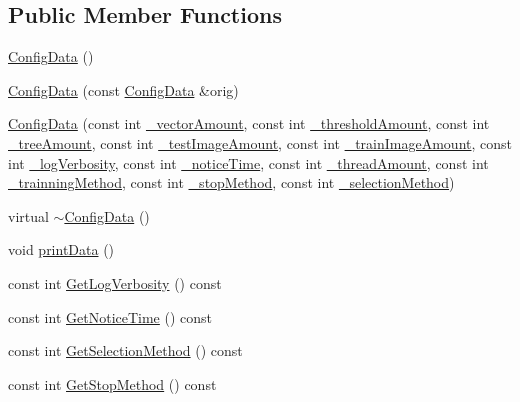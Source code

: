 \subsection*{Public Member Functions}
\begin{DoxyCompactItemize}
\item 
\hyperlink{classConfigData_adb78a42cc714fe0bfdf03d9a1e3d0cc5}{Config\+Data} ()
\item 
\hyperlink{classConfigData_afee1cf6f73db7bc62401d1ac89011fc7}{Config\+Data} (const \hyperlink{classConfigData}{Config\+Data} \&orig)
\item 
\hyperlink{classConfigData_aef5ec959c1c6db9d3be62794f6d61f21}{Config\+Data} (const int \hyperlink{classConfigData_af590033be1d5469272aa1010353232d5}{\+\_\+vector\+Amount}, const int \hyperlink{classConfigData_a1956520556b7b407196a5b4153f6b083}{\+\_\+threshold\+Amount}, const int \hyperlink{classConfigData_a4a8f85fa6d12865575b2226939964a09}{\+\_\+tree\+Amount}, const int \hyperlink{classConfigData_a40355707f3b365a9b83b7530e0de1316}{\+\_\+test\+Image\+Amount}, const int \hyperlink{classConfigData_aa9ece3a15e191b330db21d48b4f092e2}{\+\_\+train\+Image\+Amount}, const int \hyperlink{classConfigData_aa8483944273e9eaa13dff184a8079633}{\+\_\+log\+Verbosity}, const int \hyperlink{classConfigData_a1b82ac5b308abfd0e5a8e4eccec72076}{\+\_\+notice\+Time}, const int \hyperlink{classConfigData_a349c395a667ed45ff0fc4bd0753e890b}{\+\_\+thread\+Amount}, const int \hyperlink{classConfigData_a161bf96e6b8d33d2bf10b86f82546b36}{\+\_\+trainning\+Method}, const int \hyperlink{classConfigData_a0f6db7bbe04644529713729e929b67c0}{\+\_\+stop\+Method}, const int \hyperlink{classConfigData_a348ab0349d09526606e839a639881172}{\+\_\+selection\+Method})
\item 
virtual \hyperlink{classConfigData_a08a1687a8edc7ef9b9db7bd504f8364b}{$\sim$\+Config\+Data} ()
\item 
void \hyperlink{classConfigData_acf8c34f47f52ee33edbb758f795ba5a3}{print\+Data} ()
\item 
const int \hyperlink{classConfigData_af831aa5589131d606b7c4291d61848e9}{Get\+Log\+Verbosity} () const 
\item 
const int \hyperlink{classConfigData_a0d8da6611acebe44717122fa888ddd84}{Get\+Notice\+Time} () const 
\item 
const int \hyperlink{classConfigData_a126b8dd8e7ebe11d84bc191e8cfe9872}{Get\+Selection\+Method} () const 
\item 
const int \hyperlink{classConfigData_a19eafd8866f32eb7988b2c26ae07302a}{Get\+Stop\+Method} () const 

\end{DoxyCompactItemize}
